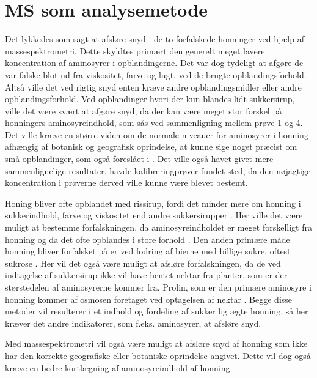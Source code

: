 \section{MS som analysemetode}
Det lykkedes som sagt at afsløre snyd i de to forfalskede honninger ved hjælp af massespektrometri.
Dette skyldtes primært den generelt meget lavere koncentration af aminosyrer i opblandingerne.
Det var dog tydeligt at afgøre de var falske blot ud fra viskositet, farve og lugt, ved de brugte opblandingsforhold.
Altså ville det ved rigtig snyd enten kræve andre opblandingsmidler eller andre opblandingsforhold.
Ved opblandinger hvori der kun blandes lidt sukkersirup, ville det være svært at afgøre snyd, da der kan være meget stor forskel på honningers aminosyreindhold, som sås ved sammenligning mellem prøve 1 og 4.
Det ville kræve en større viden om de normale niveauer for aminosyrer i honning afhængig af botanisk og geografisk oprindelse, at kunne sige noget præcist om små opblandinger, som også foreslået i \cite{geohoney}.
Det ville også havet givet mere sammenlignelige resultater, havde kalibreringprøver fundet sted, da den nøjagtige koncentration i prøverne derved ville kunne være blevet bestemt.
\par Honing bliver ofte opblandet med rissirup, fordi det minder mere om honning i sukkerindhold, farve og viskositet end andre sukkersirupper \parencite{BRShoney}.
Her ville det være muligt at bestemme forfalskningen, da aminosyreindholdet er meget forskelligt fra honning og da det ofte opblandes i store forhold \parencite{BRSaa}.
Den anden primære måde honning bliver forfalsket på er ved fodring af bierne med billige sukre, oftest sukrose \parencite{adulterationhoney}.
Her vil det også være muligt at afsløre forfalskningen, da de ved indtagelse af sukkersirup ikke vil have hentet nektar fra planter, som er der størstedelen af aminosyrerne kommer fra.
Prolin, som er den primære aminosyre i honning kommer af osmosen foretaget ved optagelsen af nektar \parencite{prolineNectar}.
Begge disse metoder vil resulterer i et indhold og fordeling af sukker lig ægte honning, så her kræver det andre indikatorer, som f.eks. aminosyrer, at afsløre snyd.
\par Med massespektrometri vil også være muligt at afsløre snyd af honning som ikke har den korrekte geografiske eller botaniske oprindelse angivet.
Dette vil dog også kræve en bedre kortlægning af aminosyreindhold af honning.
